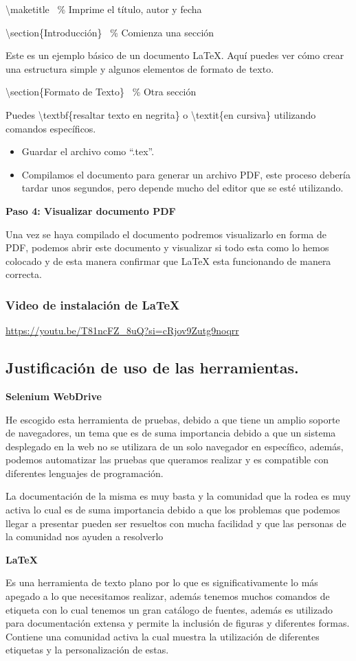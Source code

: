 \documentclass[letterpaper]{article}
\begin{document}
{\textbackslash}maketitle \ \% Imprime el título, autor y fecha

{\textbackslash}section\{Introducción\} \ \% Comienza una sección

Este es un ejemplo básico de un documento LaTeX. Aquí puedes ver cómo crear una estructura simple y algunos elementos de
formato de texto.

{\textbackslash}section\{Formato de Texto\} \ \% Otra sección

Puedes {\textbackslash}textbf\{resaltar texto en negrita\} o {\textbackslash}textit\{en cursiva\} utilizando comandos
específicos.

\begin{itemize}[series=listWWNumxx,]
\item Guardar el archivo como “.tex”.
\item Compilamos el documento para generar un archivo PDF, este proceso debería tardar unos segundos, pero depende mucho
del editor que se esté utilizando.
\end{itemize}
\textbf{Paso 4: Visualizar documento PDF}

Una vez se haya compilado el documento podremos visualizarlo en forma de PDF, podemos abrir este documento y visualizar
si todo esta como lo hemos colocado y de esta manera confirmar que LaTeX esta funcionando de manera correcta.

\subsubsection{Video de instalación de LaTeX}
\url{https://youtu.be/T81ncFZ_8uQ?si=cRjov9Zutg9noqrr}

\subsection{Justificación de uso de las herramientas.}
\textbf{Selenium WebDrive}

He escogido esta herramienta de pruebas, debido a que tiene un amplio soporte de navegadores, un tema que es de suma
importancia debido a que un sistema desplegado en la web no se utilizara de un solo navegador en específico, además,
podemos automatizar las pruebas que queramos realizar y es compatible con diferentes lenguajes de programación.

La documentación de la misma es muy basta y la comunidad que la rodea es muy activa lo cual es de suma importancia
debido a que los problemas que podemos llegar a presentar pueden ser resueltos con mucha facilidad y que las personas
de la comunidad nos ayuden a resolverlo 

\textbf{LaTeX}

Es una herramienta de texto plano por lo que es significativamente lo más apegado a lo que necesitamos realizar, además
tenemos muchos comandos de etiqueta con lo cual tenemos un gran catálogo de fuentes, además es utilizado para
documentación extensa y permite la inclusión de figuras y diferentes formas. Contiene una comunidad activa la cual
muestra la utilización de diferentes etiquetas y la personalización de estas.




\cite{libro1}
\cite{libro2}
\cite{libro3}
\cite{libro4}
\cite{libro5}
\end{document}
